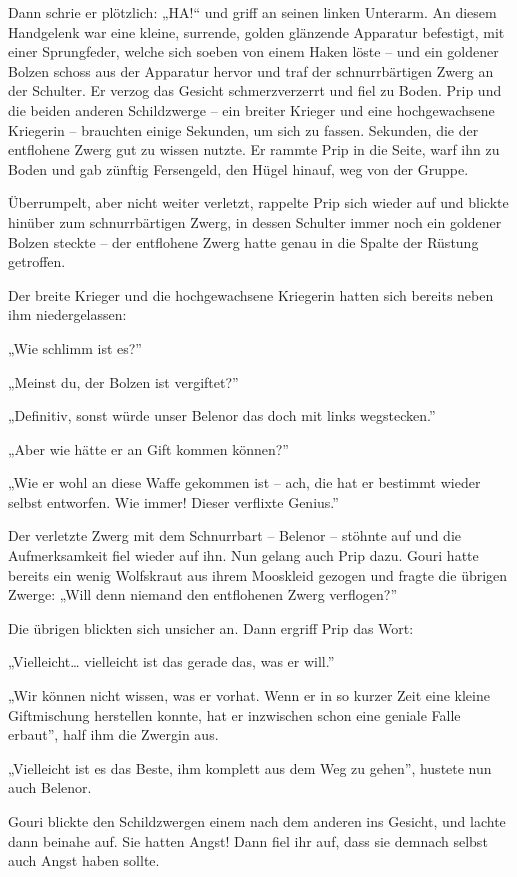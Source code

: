 Dann schrie er plötzlich: „HA!“ und griff an seinen linken Unterarm. An diesem Handgelenk war eine kleine, surrende, golden glänzende Apparatur befestigt, mit einer Sprungfeder, welche sich soeben von einem Haken löste – und ein goldener Bolzen schoss aus der Apparatur hervor und traf der schnurrbärtigen Zwerg an der Schulter. Er verzog das Gesicht schmerzverzerrt und fiel zu Boden. Prip und die beiden anderen Schildzwerge – ein breiter Krieger und eine hochgewachsene Kriegerin – brauchten einige Sekunden, um sich zu fassen. Sekunden, die der entflohene Zwerg gut zu wissen nutzte. Er rammte Prip in die Seite, warf ihn zu Boden und gab zünftig Fersengeld, den Hügel hinauf, weg von der Gruppe.

Überrumpelt, aber nicht weiter verletzt, rappelte Prip sich wieder auf und blickte hinüber zum schnurrbärtigen Zwerg, in dessen Schulter immer noch ein goldener Bolzen steckte – der entflohene Zwerg hatte genau in die Spalte der Rüstung getroffen.

Der breite Krieger und die hochgewachsene Kriegerin hatten sich bereits neben ihm niedergelassen:

„Wie schlimm ist es?”

„Meinst du, der Bolzen ist vergiftet?”

„Definitiv, sonst würde unser Belenor das doch mit links wegstecken.”

„Aber wie hätte er an Gift kommen können?”

„Wie er wohl an diese Waffe gekommen ist – ach, die hat er bestimmt wieder selbst entworfen. Wie immer! Dieser verflixte Genius.”

Der verletzte Zwerg mit dem Schnurrbart – Belenor – stöhnte auf und die Aufmerksamkeit fiel wieder auf ihn. Nun gelang auch Prip dazu. Gouri hatte bereits ein wenig Wolfskraut aus ihrem Mooskleid gezogen und fragte die übrigen Zwerge: „Will denn niemand den entflohenen Zwerg verflogen?”

Die übrigen blickten sich unsicher an. Dann ergriff Prip das Wort:

„Vielleicht… vielleicht ist das gerade das, was er will.”

„Wir können nicht wissen, was er vorhat. Wenn er in so kurzer Zeit eine kleine Giftmischung herstellen konnte, hat er inzwischen schon eine geniale Falle erbaut”, half ihm die Zwergin aus.

„Vielleicht ist es das Beste, ihm komplett aus dem Weg zu gehen”, hustete nun auch Belenor.

Gouri blickte den Schildzwergen einem nach dem anderen ins Gesicht, und lachte dann beinahe auf. Sie hatten Angst! Dann fiel ihr auf, dass sie demnach selbst auch Angst haben sollte.

